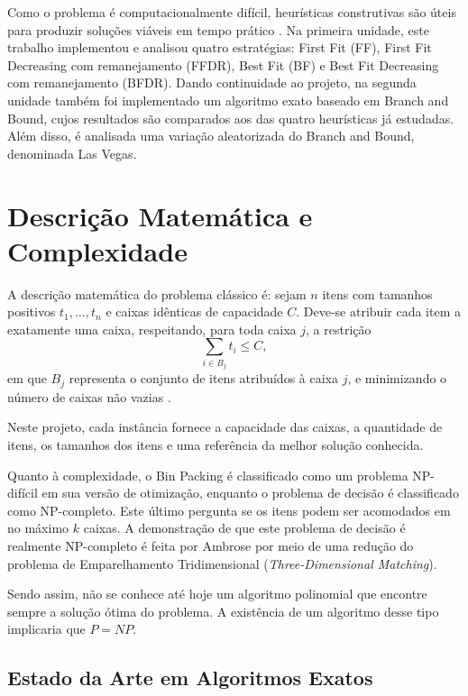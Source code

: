 \documentclass[12pt]{article}
\begin{document}
Como o problema é computacionalmente difícil, heurísticas construtivas são úteis para produzir soluções viáveis em tempo prático \cite{ambrose2025}. Na primeira unidade, este trabalho implementou e analisou quatro estratégias: First Fit (FF), First Fit Decreasing com remanejamento (FFDR), Best Fit (BF) e Best Fit Decreasing com remanejamento (BFDR). Dando continuidade ao projeto, na segunda unidade também foi implementado um algoritmo exato baseado em Branch and Bound, cujos resultados são comparados aos das quatro heurísticas já estudadas. Além disso, é analisada uma variação aleatorizada do Branch and Bound, denominada Las Vegas.

\section{Descrição Matemática e Complexidade}

A descrição matemática do problema clássico é: sejam $n$ itens com tamanhos positivos $t_1,\ldots,t_n$ e caixas idênticas de capacidade $C$. Deve-se atribuir cada item a exatamente uma caixa, respeitando, para toda caixa $j$, a restrição
\begin{equation}
  \sum_{i\in B_j} t_i \leq C,
\end{equation}
em que $B_j$ representa o conjunto de itens atribuídos à caixa $j$, e minimizando o número de caixas não vazias \cite{ambrose2025}.

Neste projeto, cada instância fornece a capacidade das caixas, a quantidade de itens, os tamanhos dos itens e uma referência da melhor solução conhecida.

Quanto à complexidade, o Bin Packing é classificado como um problema NP-difícil em sua versão de otimização, enquanto o problema de decisão é classificado como NP-completo. Este último pergunta se os itens podem ser acomodados em no máximo $k$ caixas. A demonstração de que este problema de decisão é realmente NP-completo é feita por Ambrose \cite{ambrose2025} por meio de uma redução do problema de Emparelhamento Tridimensional (\textit{Three-Dimensional Matching}).

Sendo assim, não se conhece até hoje um algoritmo polinomial que encontre sempre a solução ótima do problema. A existência de um algoritmo desse tipo implicaria que $P=NP$.

\subsection{Estado da Arte em Algoritmos Exatos}
\end{document}
